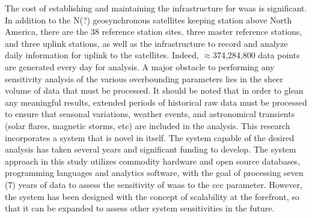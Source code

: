 
The cost of establishing and maintaining the infrastructure for \ac{waas} is significant.  In addition to the N(?) geosynchronous satellites keeping station above North America, there are the 38 reference station sites, three master reference stations, and three uplink stations, as well as the infrastructure to record and analyze daily information for uplink to the satellites.  Indeed, $\approx$374,284,800 data points are generated every day for analysis.  A major obstacle to performing any sensitivity analysis of the various overbounding parameters lies in the sheer volume of data that must be processed.  It should be noted that in order to glean any meaningful results, extended periods of historical raw data must be processed to ensure that seasonal variations, weather events, and astronomical transients (solar flares, magnetic storms, etc) are included in the analysis.  This research incorporates a system that is novel in itself.  The system capable of the desired analysis has taken several years and significant funding to develop. The system approach in this study utilizes commodity hardware and open source databases, programming languages and analytics software, with the goal of processing seven (7) years of data to assess the sensitivity of \ac{waas} to the \ac{ccc} parameter.  However, the system has been designed with the concept of scalability at the forefront, so that it can be expanded to assess other system sensitivities in the future. 


